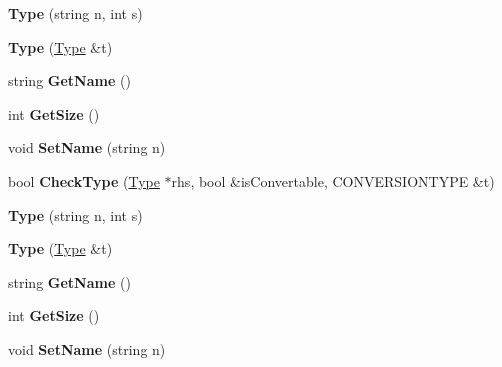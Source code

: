\begin{DoxyCompactItemize}
\item 
\hypertarget{classType_a0ec88e19865012d53e20b97677218783}{{\bfseries Type} (string n, int s)}\label{classType_a0ec88e19865012d53e20b97677218783}

\item 
\hypertarget{classType_a617481e51492ea14507c83d5dba2cce5}{{\bfseries Type} (\hyperlink{classType}{Type} \&t)}\label{classType_a617481e51492ea14507c83d5dba2cce5}

\item 
\hypertarget{classType_a8143fe4686ae1a5709a5955396c6ee26}{string {\bfseries Get\-Name} ()}\label{classType_a8143fe4686ae1a5709a5955396c6ee26}

\item 
\hypertarget{classType_afe0fca035825759785b525d2a24f69fe}{int {\bfseries Get\-Size} ()}\label{classType_afe0fca035825759785b525d2a24f69fe}

\item 
\hypertarget{classType_ab8d2328a3a76289edf42b9bf0d4f278f}{void {\bfseries Set\-Name} (string n)}\label{classType_ab8d2328a3a76289edf42b9bf0d4f278f}

\item 
\hypertarget{classType_a2574b17ddc03d5ca13309811d06f1a56}{bool {\bfseries Check\-Type} (\hyperlink{classType}{Type} $\ast$rhs, bool \&is\-Convertable, C\-O\-N\-V\-E\-R\-S\-I\-O\-N\-T\-Y\-P\-E \&t)}\label{classType_a2574b17ddc03d5ca13309811d06f1a56}

\item 
\hypertarget{classType_a0ec88e19865012d53e20b97677218783}{{\bfseries Type} (string n, int s)}\label{classType_a0ec88e19865012d53e20b97677218783}

\item 
\hypertarget{classType_a617481e51492ea14507c83d5dba2cce5}{{\bfseries Type} (\hyperlink{classType}{Type} \&t)}\label{classType_a617481e51492ea14507c83d5dba2cce5}

\item 
\hypertarget{classType_a8143fe4686ae1a5709a5955396c6ee26}{string {\bfseries Get\-Name} ()}\label{classType_a8143fe4686ae1a5709a5955396c6ee26}

\item 
\hypertarget{classType_afe0fca035825759785b525d2a24f69fe}{int {\bfseries Get\-Size} ()}\label{classType_afe0fca035825759785b525d2a24f69fe}

\item 
\hypertarget{classType_ab8d2328a3a76289edf42b9bf0d4f278f}{void {\bfseries Set\-Name} (string n)}\label{classType_ab8d2328a3a76289edf42b9bf0d4f278f}


\end{DoxyCompactItemize}
